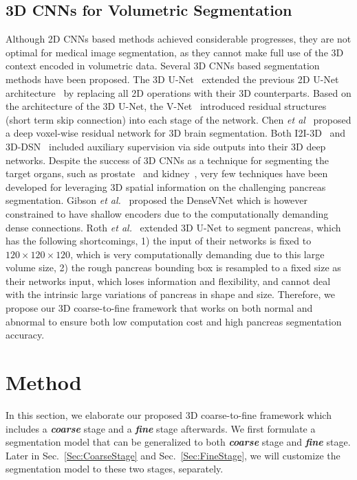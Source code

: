 \documentclass[10pt,twocolumn,letterpaper]{article}
\begin{document}
\subsection{3D CNNs for Volumetric Segmentation}
Although 2D CNNs based methods achieved considerable progresses, they are not optimal for medical image segmentation, as they cannot make full use of the 3D context encoded in volumetric data. Several 3D CNNs based segmentation methods have been proposed. The 3D U-Net~\cite{cciccek20163d} extended the previous 2D U-Net architecture~\cite{ronneberger2015u} by replacing all 2D operations with their 3D counterparts. Based on the architecture of the 3D U-Net, the V-Net~\cite{milletari2016v} introduced residual structures~\cite{he2016deep} (short term skip connection) into each stage of the network. Chen \textit{et al}~\cite{chen2017voxresnet} proposed a deep voxel-wise residual network for 3D brain segmentation. Both I2I-3D~\cite{merkow2016dense} and 3D-DSN~\cite{dou20173d} included auxiliary supervision via side outputs into their 3D deep networks. Despite the success of 3D CNNs as a technique for segmenting the target organs, such as prostate~\cite{milletari2016v} and kidney~\cite{cciccek20163d}, very few techniques have been developed for leveraging 3D spatial information on the challenging pancreas segmentation. Gibson \emph{et al.}~\cite{gibson2018automatic} proposed the DenseVNet which is however constrained to have shallow encoders due to the computationally demanding dense connections. Roth \emph{et al.}~\cite{roth2018towards} extended 3D U-Net to segment pancreas, which has the following shortcomings, 1) the input of their networks is fixed to $120\times120\times120$, which is very computationally demanding due to this large volume size, 2) the rough pancreas bounding box is resampled to a fixed size as their networks input, which loses information and flexibility, and cannot deal with the intrinsic large variations of pancreas in shape and size. Therefore, we propose our 3D coarse-to-fine framework that works on both normal and abnormal to ensure both low computation cost and high pancreas segmentation accuracy.


\section{Method}

In this section, we elaborate our proposed 3D coarse-to-fine framework which includes a \textit{\textbf{coarse}} stage and a \textit{\textbf{fine}} stage afterwards. We first formulate a segmentation model that can be generalized to both \textit{\textbf{coarse}} stage and \textit{\textbf{fine}} stage. Later in Sec.~\ref{Sec:CoarseStage} and Sec.~\ref{Sec:FineStage}, we will customize the segmentation model to these two stages, separately.
\end{document}
